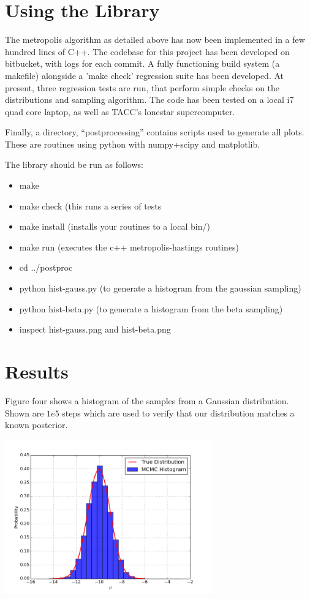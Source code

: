 \documentclass{article}
\begin{document}
\section{Using the Library}

The metropolis algorithm as detailed above has now been implemented in a few hundred lines of C++. 
The codebase for this project has been developed on bitbucket, with logs
 for each commit. A fully functioning build system (a makefile) alongside a 'make  
 check' regression suite has been developed. At present, three
 regression tests are run, that perform simple checks on the distributions and sampling algorithm. 
The code has been tested on a local i7 quad core laptop, as well as TACC's lonestar supercomputer. 

Finally, a directory, ``postprocessing'' contains scripts used to
generate all plots. These are routines using python with numpy+scipy and
matplotlib. 

The library should be run as follows:

\begin{itemize}
\item make
\item make check (this runs a series of tests
\item make install (installs your routines to a local bin/)
\item make run (executes the c++ metropolis-hastings routines)
\item cd ../postproc
\item python hist-gauss.py (to generate a histogram from the gaussian sampling)
\item python hist-beta.py (to generate a histogram from the beta sampling)
\item inspect hist-gauss.png and hist-beta.png
\end{itemize}

\section{Results}

Figure four shows a histogram of the samples from a Gaussian distribution. 
Shown are $1e5$ steps which are used to verify that our distribution matches a known posterior. 
\begin{center}
 \includegraphics[width=3.5in]{figs/hist-gauss}
\end{center}
\end{document}
